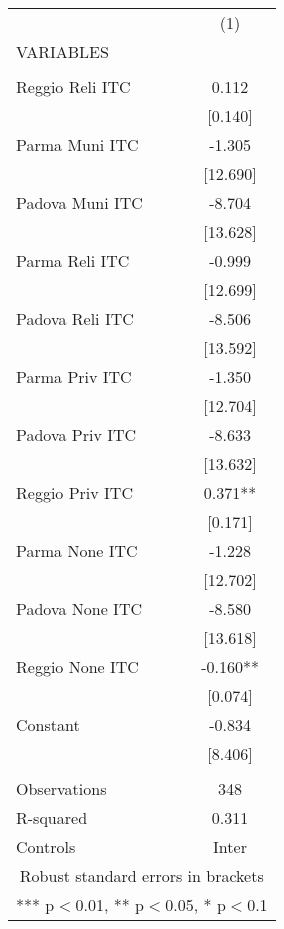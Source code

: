 \begin{tabular}{lc} \hline
 & (1) \\
VARIABLES &  \\ \hline
 &  \\
Reggio Reli ITC & 0.112 \\
 & [0.140] \\
Parma Muni ITC & -1.305 \\
 & [12.690] \\
Padova Muni ITC & -8.704 \\
 & [13.628] \\
Parma Reli ITC & -0.999 \\
 & [12.699] \\
Padova Reli ITC & -8.506 \\
 & [13.592] \\
Parma Priv ITC & -1.350 \\
 & [12.704] \\
Padova Priv ITC & -8.633 \\
 & [13.632] \\
Reggio Priv ITC & 0.371** \\
 & [0.171] \\
Parma None ITC & -1.228 \\
 & [12.702] \\
Padova None ITC & -8.580 \\
 & [13.618] \\
Reggio None ITC & -0.160** \\
 & [0.074] \\
Constant & -0.834 \\
 & [8.406] \\
 &  \\
Observations & 348 \\
R-squared & 0.311 \\
 Controls & Inter \\ \hline
\multicolumn{2}{c}{ Robust standard errors in brackets} \\
\multicolumn{2}{c}{ *** p$<$0.01, ** p$<$0.05, * p$<$0.1} \\
\end{tabular}
